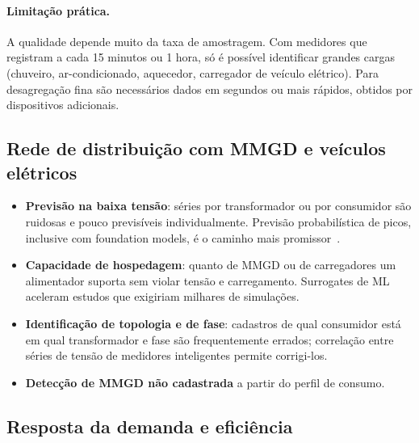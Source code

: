 \documentclass[10pt,a4paper,oneside]{article}
\begin{document}
\paragraph{Limitação prática.} A qualidade depende muito da taxa de
amostragem. Com medidores que registram a cada 15 minutos ou 1 hora, só é
possível identificar grandes cargas (chuveiro, ar-condicionado, aquecedor,
carregador de veículo elétrico). Para desagregação fina são necessários
dados em segundos ou mais rápidos, obtidos por dispositivos adicionais.

\subsection{Rede de distribuição com MMGD e veículos elétricos}

\begin{itemize}
  \item \textbf{Previsão na baixa tensão}: séries por transformador ou por
    consumidor são ruidosas e pouco previsíveis individualmente. Previsão
    probabilística de picos, inclusive com foundation models, é o caminho
    mais promissor~\cite{lvpeak}.
  \item \textbf{Capacidade de hospedagem}: quanto de MMGD ou de carregadores um
    alimentador suporta sem violar tensão e carregamento. Surrogates de ML
    aceleram estudos que exigiriam milhares de simulações.
  \item \textbf{Identificação de topologia e de fase}: cadastros de qual
    consumidor está em qual transformador e fase são frequentemente errados;
    correlação entre séries de tensão de medidores inteligentes permite
    corrigi-los.
  \item \textbf{Detecção de MMGD não cadastrada} a partir do perfil de
    consumo.
\end{itemize}

\subsection{Resposta da demanda e eficiência}
\end{document}
